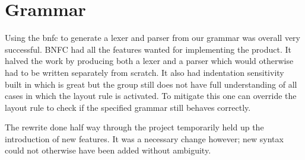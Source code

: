 \section{Grammar}

Using the \gls{bnfc} to generate a lexer and parser from our grammar was overall very successful. BNFC had all the features wanted for implementing the product. It halved the work by producing both a lexer and a parser which would otherwise had to be written separately from scratch. It also had indentation sensitivity built in which is great but the group still does not have full understanding of all cases in which the layout rule is activated. To mitigate this one can override the layout rule to check if the specified grammar still behaves correctly. 

The rewrite done half way through the project temporarily held up the introduction of new features. It was a necessary change however; new syntax could not otherwise have been added without ambiguity.
